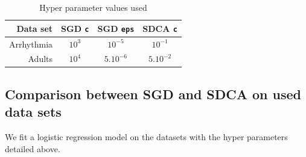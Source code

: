 \documentclass{article}
\begin{document}
\begin{table}[H]
	\centering
	\begin{tabular}{rccc}
		\toprule
		Data set & SGD \texttt{c} & SGD \texttt{eps} & SDCA \texttt{c}\\
		\midrule
		Arrhythmia & $10^3$ & $10^{-5}$ & $10^{-1}$\\
		Adults     & $10^4$ & $5.10^{-6}$ & $5.10^{-2}$\\
		\bottomrule
	\end{tabular}
	\caption{Hyper parameter values used}
\end{table}

\subsection{Comparison between SGD and SDCA on used data sets}

We fit a logistic regression model on the datasets with the hyper parameters detailed above.
\end{document}
